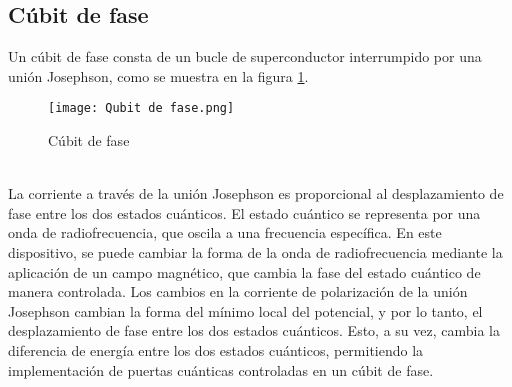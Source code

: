 \documentclass[12pt]{article}
\begin{document}
\subsection{Cúbit de fase}
Un cúbit de fase consta de un bucle de superconductor interrumpido por una unión Josephson, como se muestra en la figura \ref{fig:Cúbit de fase}. 
\begin{figure}[ht]
  \centering
  \texttt{[image: Qubit de fase.png]}
  \caption{Cúbit de fase \cite{gu_microwave_2017}}
  \label{fig:Cúbit de fase}
\end{figure} \\
La corriente a través de la unión Josephson es proporcional al desplazamiento de fase entre los dos estados cuánticos. El estado cuántico se representa por una onda de radiofrecuencia, que oscila a una frecuencia específica. En este dispositivo, se puede cambiar la forma de la onda de radiofrecuencia mediante la aplicación de un campo magnético, que cambia la fase del estado cuántico de manera controlada. Los cambios en la corriente de polarización de la unión Josephson cambian la forma del mínimo local del potencial, y por lo tanto, el desplazamiento de fase entre los dos estados cuánticos. Esto, a su vez, cambia la diferencia de energía entre los dos estados cuánticos, permitiendo la implementación de puertas cuánticas controladas en un cúbit de fase.
\\
\end{document}

